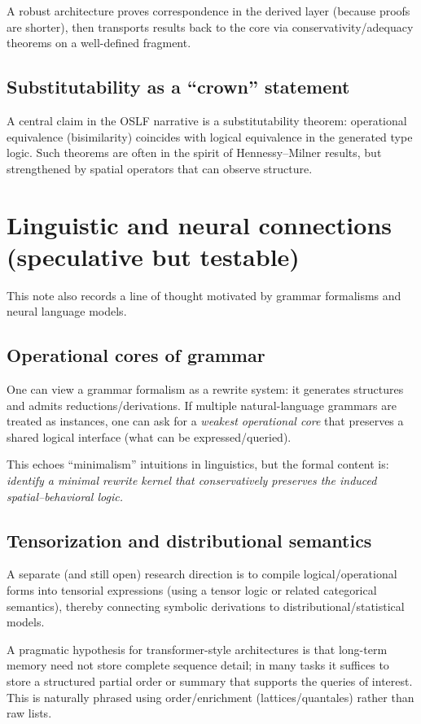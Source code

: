\documentclass[11pt]{article}
\newcommand{\OSLF}{\textsf{OSLF}}
\begin{document}
A robust architecture proves correspondence in the derived layer (because proofs are shorter),
then transports results back to the core via conservativity/adequacy theorems on a well-defined fragment.

\subsection{Substitutability as a ``crown'' statement}
A central claim in the \OSLF{} narrative is a substitutability theorem:
operational equivalence (bisimilarity) coincides with logical equivalence in the generated type logic.
Such theorems are often in the spirit of Hennessy--Milner results, but strengthened by spatial operators
that can observe structure.

\section{Linguistic and neural connections (speculative but testable)}

This note also records a line of thought motivated by grammar formalisms and neural language models.

\subsection{Operational cores of grammar}
One can view a grammar formalism as a rewrite system: it generates structures and admits reductions/derivations.
If multiple natural-language grammars are treated as instances, one can ask for a \emph{weakest operational core}
that preserves a shared logical interface (what can be expressed/queried).

This echoes ``minimalism'' intuitions in linguistics, but the formal content is:
\emph{identify a minimal rewrite kernel that conservatively preserves the induced spatial--behavioral logic.}

\subsection{Tensorization and distributional semantics}
A separate (and still open) research direction is to compile logical/operational forms into tensorial expressions
(using a tensor logic or related categorical semantics), thereby connecting symbolic derivations to
distributional/statistical models.

A pragmatic hypothesis for transformer-style architectures is that long-term memory need not store complete
sequence detail; in many tasks it suffices to store a structured partial order or summary that supports the
queries of interest. This is naturally phrased using order/enrichment (lattices/quantales) rather than raw lists.
\end{document}
